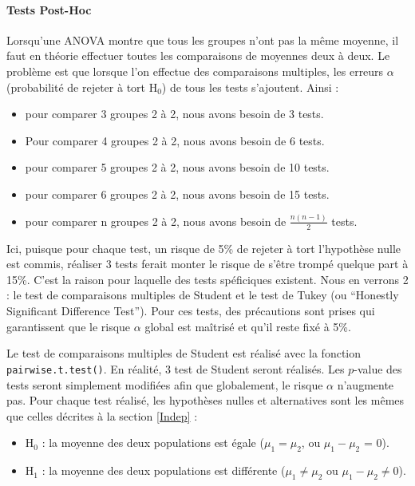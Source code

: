 \documentclass[a4paperpaper,]{article}
\providecommand{\tightlist}{%
  \setlength{\itemsep}{0pt}\setlength{\parskip}{0pt}}
\let\oldparagraph\paragraph
\renewcommand{\paragraph}[1]{\oldparagraph{#1}\mbox{}}
\begin{document}
\hypertarget{tests-post-hoc}{%
\paragraph{Tests Post-Hoc}\label{tests-post-hoc}}

Lorsqu'une ANOVA montre que tous les groupes n'ont pas la même moyenne, il faut en théorie effectuer toutes les comparaisons de moyennes deux à deux. Le problème est que lorsque l'on effectue des comparaisons multiples, les erreurs \(\alpha\) (probabilité de rejeter à tort H\(_0\)) de tous les tests s'ajoutent. Ainsi :

\begin{itemize}
\tightlist
\item
  pour comparer 3 groupes 2 à 2, nous avons besoin de 3 tests.
\item
  Pour comparer 4 groupes 2 à 2, nous avons besoin de 6 tests.
\item
  pour comparer 5 groupes 2 à 2, nous avons besoin de 10 tests.
\item
  pour comparer 6 groupes 2 à 2, nous avons besoin de 15 tests.
\item
  pour comparer n groupes 2 à 2, nous avons besoin de \(\frac{n(n-1)}{2}\) tests.
\end{itemize}

Ici, puisque pour chaque test, un risque de 5\% de rejeter à tort l'hypothèse nulle est commis, réaliser 3 tests ferait monter le risque de s'être trompé quelque part à 15\%. C'est la raison pour laquelle des tests spéficiques existent. Nous en verrons 2 : le test de comparaisons multiples de Student et le test de Tukey (ou ``Honestly Significant Difference Test''). Pour ces tests, des précautions sont prises qui garantissent que le risque \(\alpha\) global est maîtrisé et qu'il reste fixé à 5\%.

Le test de comparaisons multiples de Student est réalisé avec la fonction \texttt{pairwise.t.test()}. En réalité, 3 test de Student seront réalisés. Les \(p\)-value des tests seront simplement modifiées afin que globalement, le risque \(\alpha\) n'augmente pas. Pour chaque test réalisé, les hypothèses nulles et alternatives sont les mêmes que celles décrites à la section \ref{Indep} :

\begin{itemize}
\tightlist
\item
  H\(_0\) : la moyenne des deux populations est égale (\(\mu_1 = \mu_2\), ou \(\mu_1 - \mu_2\) = 0).
\item
  H\(_1\) : la moyenne des deux populations est différente (\(\mu_1 \neq \mu_2\) ou \(\mu_1 - \mu_2 \neq 0\)).
\end{itemize}
\end{document}
